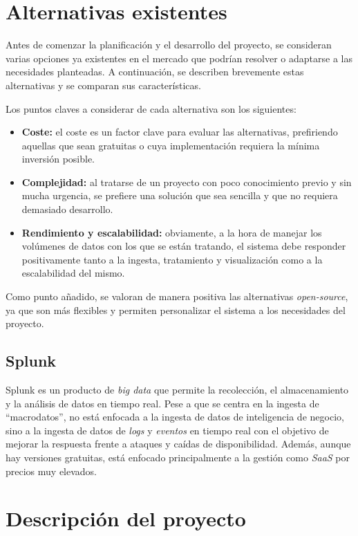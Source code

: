 \section{Alternativas existentes}\label{sec:alternativas}
Antes de comenzar la planificación y el desarrollo del proyecto, se consideran varias opciones
ya existentes en el mercado que podrían resolver o adaptarse a las necesidades planteadas. A
continuación, se describen brevemente estas alternativas y se comparan sus características.

Los puntos claves a considerar de cada alternativa son los siguientes:
\begin{itemize}
	\item \textbf{Coste:} el coste es un factor clave para evaluar las alternativas, prefiriendo
		aquellas que sean gratuitas o cuya implementación requiera la mínima inversión posible.
	\item \textbf{Complejidad:} al tratarse de un proyecto con poco conocimiento previo y sin
		mucha urgencia, se prefiere una solución que sea sencilla y que no requiera demasiado
		desarrollo.
	\item \textbf{Rendimiento y escalabilidad:} obviamente, a la hora de manejar los volúmenes
		de datos con los que se están tratando, el sistema debe responder positivamente tanto
		a la ingesta, tratamiento y visualización como a la escalabilidad del mismo.
\end{itemize}

Como punto añadido, se valoran de manera positiva las alternativas \textit{open-source}, ya
que son más flexibles y permiten personalizar el sistema a los necesidades del proyecto.

\subsection{Splunk}
Splunk es un producto de \textit{big data} que permite la recolección, el almacenamiento y la
análisis de datos en tiempo real. Pese a que se centra en la ingesta de ``macrodatos'', no
está enfocada a la ingesta de datos de inteligencia de negocio, sino a la ingesta de datos
de \textit{logs} y \textit{eventos} en tiempo real con el objetivo de mejorar la respuesta
frente a ataques y caídas de disponibilidad. Además, aunque hay versiones gratuitas, está
enfocado principalmente a la gestión como \textit{SaaS} por precios muy elevados.



\newpage{}
\section{Descripción del proyecto}\label{sec:descripcion}
